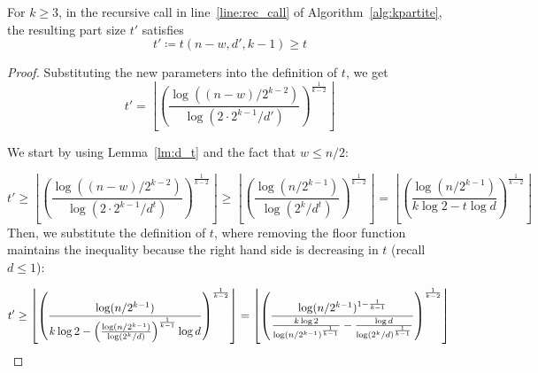 \begin{lemma}\label{lm:t_prime}
    For $k \geq 3$, in the recursive call in line~\ref{line:rec_call} of Algorithm~\ref{alg:kpartite},
    the resulting part size $t'$ satisfies
    \[
        t' \coloneqq t(n - w, d', k - 1) \geq t
    \]
    
    \begin{proof}

        Substituting the new parameters into the definition of $t$, we get
        \[
            t' = \left\lfloor \left(  \frac{\log ((n-w)/2^{k-2})}{\log (2 \cdot 2^{k-1}/d')} \right)^
            {\frac{1}{k-2}} \right\rfloor
        \]

        We start by using Lemma~\ref{lm:d_t} and the fact that $w \leq n/2$:

        \[
            t' \geq
            \left\lfloor \left(  \frac{\log ((n-w)/2^{k-2})}{\log (2 \cdot 2^{k-1}/d^t)} \right)^
            {\frac{1}{k-2}} \right\rfloor \geq
            \left\lfloor \left(  \frac{\log (n/2^{k-1})}{\log (2^{k}/d^t)} \right)^{\frac{1}{k-2}} \right\rfloor =
            \left\lfloor \left(  \frac{\log (n / 2^{k-1})}{k \log 2 - t \log d} \right)^
            {\frac{1}{k-2}} \right\rfloor
        \]
        Then, we substitute the definition of $t$, where removing the floor function
        maintains the inequality because the right hand side is decreasing in $t$ (recall $d \leq 1$):

        \[
            t' \geq
            \left\lfloor \left(  \frac{\log (n / 2^{k-1})}
            {k \log 2 - \left(  \frac{\log (n / 2^{k-1})}{\log (2^{k}/d)} \right)^{\frac{1}{k-1}}  \log d} \right)^
            {\frac{1}{k-2}} \right\rfloor
            =
            \left\lfloor \left(  \frac{\log (n / 2^{k-1})^{1-\frac{1}{k-1}}}
            {\frac{k \log 2}{\log(n / 2^{k-1})^{\frac{1}{k-1}}} - \frac{\log d}{\log (2^{k}/d)^{\frac{1}{k-1}}} }
            \right)^{\frac{1}{k-2}} \right\rfloor \\
        \]


\end{proof}
\end{lemma}
